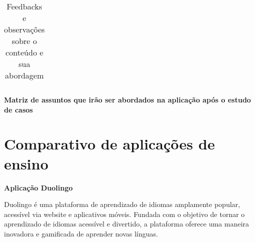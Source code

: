 \begin{longtable}{|m{1.5cm}|m{3.5cm}|m{4.5cm}|m{5cm}|}
\caption{Feedbacks e observações sobre o conteúdo e sua abordagem}




\end{longtable}

\textbf{Matriz de assuntos que irão ser abordados na aplicação após o estudo de casos}


\section{Comparativo de aplicações de ensino}

\textbf{Aplicação Duolingo}

Duolingo é uma plataforma de aprendizado de idiomas amplamente popular, acessível via website e aplicativos móveis. Fundada com o objetivo de tornar o aprendizado de idiomas acessível e divertido, a plataforma oferece uma maneira inovadora e gamificada de aprender novas línguas. 

